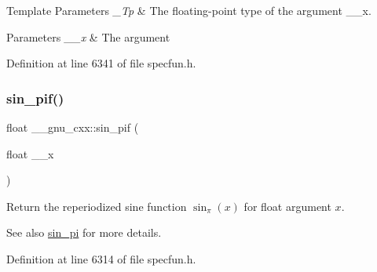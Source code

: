 \begin{DoxyTemplParams}{Template Parameters}
{\em \+\_\+\+Tp} & The floating-\/point type of the argument {\ttfamily \+\_\+\+\_\+x}. \\
\hline
\end{DoxyTemplParams}

\begin{DoxyParams}{Parameters}
{\em \+\_\+\+\_\+x} & The argument \\
\hline
\end{DoxyParams}


Definition at line 6341 of file specfun.\+h.

\mbox{\label{group__gnu__math__spec__func_ga74fc8e2dd770850e7ea8bf8a28a71777}} 
\subsubsection{\texorpdfstring{sin\+\_\+pif()}{sin\_pif()}}
{\footnotesize\ttfamily float \+\_\+\+\_\+gnu\+\_\+cxx\+::sin\+\_\+pif (\begin{DoxyParamCaption}\item[{float}]{\+\_\+\+\_\+x }\end{DoxyParamCaption})\hspace{0.3cm}{\ttfamily [inline]}}

Return the reperiodized sine function $ \sin_\pi(x) $ for {\ttfamily float} argument $ x $.

\begin{DoxySeeAlso}{See also}
\hyperlink{group__gnu__math__spec__func_ga220f8a9a0477697cff96e84dc911d5f0}{sin\+\_\+pi} for more details. 
\end{DoxySeeAlso}


Definition at line 6314 of file specfun.\+h.

\mbox{\label{group__gnu__math__spec__func_ga0bda860961b0a121e266b278f260634b}} 
